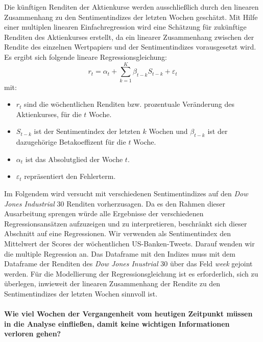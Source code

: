 Die künftigen Renditen der Aktienkurse werden ausschließlich durch den linearen Zusammenhang zu den Sentimentindizes der letzten Wochen geschätzt. Mit Hilfe einer multiplen linearen Einfachregression wird eine Schätzung für zukünftige Renditen des Aktienkurses erstellt, da ein linearer Zusammenhang zwischen der Rendite des einzelnen Wertpapiers und der Sentimentindizes vorausgesetzt wird. Es ergibt sich folgende lineare Regressionsgleichung:
\begin{equation}
r_{t}=\alpha_{t}+ \sum_{k=1}^{K} \beta_{t-k} S_{t-k}+\varepsilon_{t}
\end{equation}
mit:
\begin{itemize}
	\item  $r_{t}$ sind die wöchentlichen Renditen bzw. prozentuale Veränderung des Aktienkurses, für die $t$ Woche.
	\item $S_{t-k}$ ist der Sentimentindex der letzten $k$ Wochen und $\beta_{t-k}$ ist der dazugehörige Betakoeffizent für die $t$ Woche.
	\item $\alpha_{t}$ ist das Absolutglied der Woche $t$.
	\item $\varepsilon_{t}$ repräsentiert den Fehlerterm.
\end{itemize}
Im Folgendem wird versucht mit verschiedenen Sentimentindizes auf den \textit{Dow Jones Industrial} $30$ Renditen vorherzusagen. Da es den Rahmen dieser Ausarbeitung sprengen würde alle Ergebnisse der verschiedenen Regressionsansätzen aufzuzeigen und zu interpretieren, beschränkt sich dieser Abschnitt auf eine Regressionen. Wir verwenden als Sentimentindex den Mittelwert der Scores der wöchentlichen US-Banken-Tweets. Darauf wenden wir die multiple Regression an. Das Dataframe mit den Indizes muss mit dem Dataframe der Renditen des \textit{Dow Jones Inustrial} $30$  über das Feld \textit{week} gejoint werden. Für die Modellierung der Regressionsgleichung ist es erforderlich, sich zu überlegen, inwieweit der linearen Zusammenhang der Rendite zu den Sentimentindizes der letzten Wochen sinnvoll ist.\\
\\
\textbf{Wie viel Wochen der Vergangenheit vom heutigen Zeitpunkt müssen in die Analyse einfließen, damit keine wichtigen Informationen verloren gehen?} 
\\
\\
